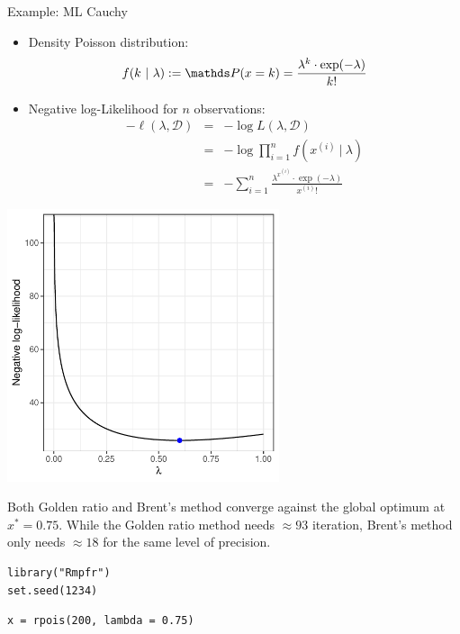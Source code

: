 \documentclass[11pt,compress,t,notes=noshow, xcolor=table]{beamer}
\begin{document}
\begin{vbframe}{Example: ML Cauchy}
\begin{itemize}
\item Density Poisson distribution:
$$
f(k ~|~ \lambda) := \P(x = k) = \frac{\lambda^k \cdot \exp(-\lambda)}{k!}
$$
\item Negative log-Likelihood for $n$ observations:
\begin{eqnarray*}
- \ell(\lambda, \mathcal{D}) &=& - \log L(\lambda, \mathcal{D}) \\ &=& - \log \prod_{i = 1}^n  f\left(x^{(i)} ~|~ \lambda\right) \\ &=&  - \sum_{i = 1}^n \frac{\lambda^{x^{(i)} } \cdot \exp(-\lambda)}{x^{(i)} !} 
\end{eqnarray*}

\end{itemize}

\framebreak 

\begin{center}
	\includegraphics[width = 0.6\textwidth]{figure_man/poisson.pdf}
\end{center}

\framebreak 

Both Golden ratio and Brent's method converge against the global optimum at $x^\ast = 0.75$. While the Golden ratio method needs $\approx 93$ iteration, Brent's method only needs $\approx 18$ for the same level of precision. 

\lz
\footnotesize
\begin{verbatim}
library("Rmpfr")
set.seed(1234)
\end{verbatim}

\vspace{0.2cm}

\begin{verbatim}
x = rpois(200, lambda = 0.75)


\end{verbatim}
\end{vbframe}
\end{document}
